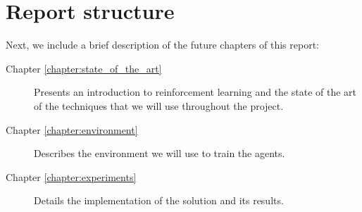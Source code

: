 \section{Report structure}

Next, we include a brief description of the future chapters of this report:

\begin{description}
    \item[Chapter \ref{chapter:state_of_the_art}] Presents an introduction to reinforcement learning and the state of the art of the techniques that we will use throughout the project.
    \item[Chapter \ref{chapter:environment}] Describes the environment we will use to train the agents.
    \item[Chapter \ref{chapter:experiments}] Details the implementation of the solution and its results.
\end{description}